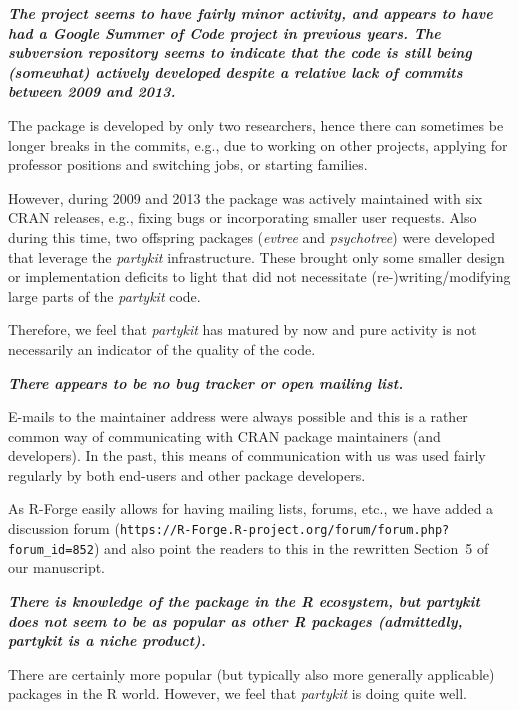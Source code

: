 \documentclass{article}
\begin{document}
\medskip

\textbf{\textit{%
The project seems to have fairly minor activity, and appears to have had a
Google Summer of Code project in previous years.  The subversion repository
seems to indicate that the code is still being (somewhat) actively developed
despite a relative lack of commits between 2009 and 2013.
}}

\smallskip

The package is developed by only two researchers, hence there can sometimes
be longer breaks in the commits, e.g., due to working on other projects,
applying for professor positions and switching jobs, or starting families.

However, during 2009 and 2013 the package was actively maintained with six
CRAN releases, e.g., fixing bugs or incorporating smaller user requests. Also
during this time, two offspring packages (\emph{evtree} and \emph{psychotree}) were
developed that leverage the \emph{partykit} infrastructure. These brought
only some smaller design or implementation deficits to light that did not
necessitate (re-)writing/modifying large parts of the \emph{partykit} code.

Therefore, we feel that \emph{partykit} has matured by now and pure activity
is not necessarily an indicator of the quality of the code.

\medskip

\textbf{\textit{%
There appears to be no bug tracker or open mailing list.
}}

\smallskip

E-mails to the maintainer address were always possible and this is a rather common
way of communicating with CRAN package maintainers (and developers). In the past,
this means of communication with us was used fairly regularly by both end-users
and other package developers.

As \textsf{R}-Forge easily allows for having mailing lists, forums, etc., we
have added a discussion forum (\texttt{https://R-Forge.R-project.org/forum/forum.php?forum\_id=852})
and also point the readers to this in the rewritten Section~5 of our manuscript.

\medskip

\textbf{\textit{%
There is knowledge of the package in the R ecosystem, but partykit does not seem
to be as popular as other R packages (admittedly, partykit is a niche product).
}}

\smallskip

There are certainly more popular (but typically also more generally applicable) packages
in the \textsf{R} world. However, we feel that \emph{partykit} is doing quite
well. 
\end{document}
